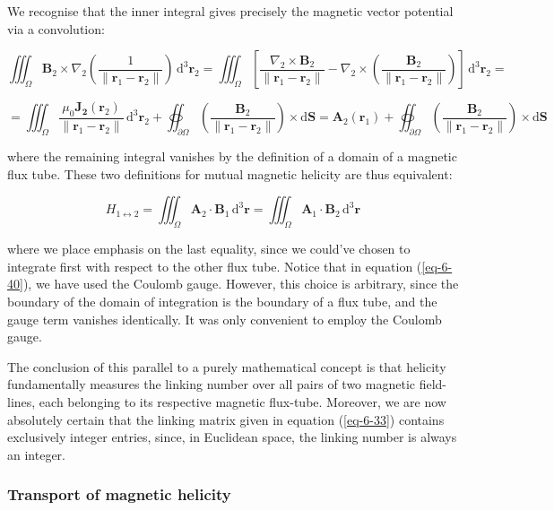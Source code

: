 We recognise that the inner integral gives precisely the magnetic vector potential via a convolution:

\begin{equation}
    \iiint_\Omega\mathbf{B}_2\times\nabla_2\left(\frac{1}{\|\mathbf{r}_1-\mathbf{r}_2\|}\right)\,\mathrm{d}^3\mathbf{r}_2=\iiint_\Omega\left[\frac{\nabla_2\times\mathbf{B}_2}{\|\mathbf{r}_1-\mathbf{r}_2\|}-\nabla_2\times\left(\frac{\mathbf{B}_2}{\|\mathbf{r}_1-\mathbf{r}_2\|}\right)\right]\,\mathrm{d}^3\mathbf{r}_2=
\end{equation}

\begin{equation}
    \label{eq-6-40}
    =\iiint_\Omega\frac{\mu_0\mathbf{J_2}(\mathbf{r}_2)}{\|\mathbf{r}_1-\mathbf{r}_2\|}\,\mathrm{d}^3\mathbf{r}_2+\oiint_{\partial\Omega}\left(\frac{\mathbf{B}_2}{\|\mathbf{r}_1-\mathbf{r}_2\|}\right)\times\mathrm{d}\mathbf{S}=\mathbf{A}_2(\mathbf{r}_1)+\oiint_{\partial\Omega}\left(\frac{\mathbf{B}_2}{\|\mathbf{r}_1-\mathbf{r}_2\|}\right)\times\mathrm{d}\mathbf{S}
\end{equation}

where the remaining integral vanishes by the definition of a domain of a magnetic flux tube. These two definitions for mutual magnetic helicity are thus equivalent:

\begin{equation}
    H_{1\leftrightarrow2}=\iiint_\Omega\mathbf{A}_2\cdot\mathbf{B}_1\,\mathrm{d}^3\mathbf{r}=\iiint_\Omega\mathbf{A}_1\cdot\mathbf{B}_2\,\mathrm{d}^3\mathbf{r}
\end{equation}

where we place emphasis on the last equality, since we could've chosen to integrate first with respect to the other flux tube. Notice that in equation (\ref{eq-6-40}), we have used the Coulomb gauge. However, this choice is arbitrary, since the boundary of the domain of integration is the boundary of a flux tube, and the gauge term vanishes identically. It was only convenient to employ the Coulomb gauge.

\quad The conclusion of this parallel to a purely mathematical concept is that helicity fundamentally measures the linking number over all pairs of two magnetic field-lines, each belonging to its respective magnetic flux-tube. Moreover, we are now absolutely certain that the linking matrix given in equation (\ref{eq-6-33}) contains exclusively integer entries, since, in Euclidean space, the linking number is always an integer.

\subsubsection{Transport of magnetic helicity}

